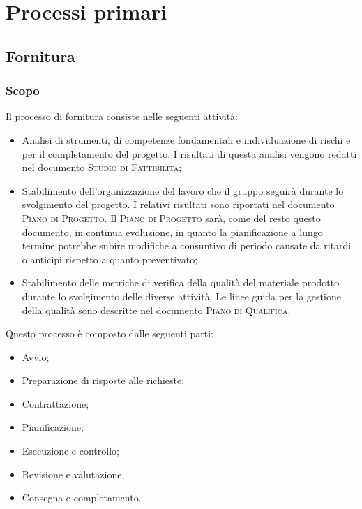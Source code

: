 \section{Processi primari}
\label{sec:processi_primari}

\subsection{Fornitura}

\subsubsection{Scopo}

Il processo di fornitura consiste nelle seguenti attività:
\begin{itemize}
    \item Analisi di strumenti, di competenze fondamentali e individuazione di rischi e  per il 
    completamento del progetto. I risultati di questa analisi vengono redatti nel documento 
    \textsc{Studio di Fattibilità};
    \item Stabilimento dell'organizzazione del lavoro che il gruppo seguirà durante lo svolgimento del progetto. 
    I relativi risultati sono riportati nel documento \textsc{Piano di Progetto}. 
    Il \textsc{Piano di Progetto} sarà, come del resto questo documento, in continua evoluzione, in quanto la 
    pianificazione a lungo termine potrebbe subire modifiche a consuntivo di periodo causate da ritardi o anticipi 
    rispetto a quanto preventivato;
    \item Stabilimento delle metriche di verifica della qualità del materiale prodotto durante lo svolgimento delle 
    diverse attività. Le linee guida per la gestione della qualità sono descritte nel documento 
    \textsc{Piano di Qualifica}.
\end{itemize}

Questo processo è composto dalle seguenti parti:
\begin{itemize}
    \item Avvio;
    \item Preparazione di risposte alle richieste;
    \item Contrattazione;
    \item Pianificazione;
    \item Esecuzione e controllo;
    \item Revisione e valutazione;
    \item Consegna e completamento.
\end{itemize}

